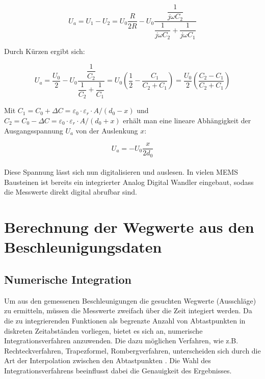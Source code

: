 \documentclass[12pt,a4paper,twoside,BCOR=12.5mm]{scrartcl}
\begin{document}
\begin{equation}
U_a = U_1 - U_2 = U_0 \frac{R}{2 R} - U_0 \dfrac{\dfrac{1}{j \omega C_2} } { \dfrac{1} {j \omega C_2} + \dfrac{1}{j \omega C_1} }
\end{equation}

Durch Kürzen ergibt sich:

\begin{equation}
U_a = \frac{U_0}{2} - U_0 \dfrac{\dfrac{1}{C_2}}{\dfrac{1}{C_2} + \dfrac{1}{C_1}} = U_0 \left( \frac{1}{2} - \frac{C_1}{C_2 + C_1} \right) = \frac{U_0}{2} \left( \frac{C_2 - C_1}{C_2 + C_1} \right)
\end{equation}

Mit $C_1 = C_0 + \Delta C = \varepsilon _0 \cdot \varepsilon _r \cdot A / (d_0 - x )$ und $C_2 = C_0 - \Delta C = \varepsilon _0 \cdot \varepsilon _r \cdot A / (d_0 + x )$ erhält man eine lineare Abhängigkeit der Ausgangsspannung $U_a$ von der Auslenkung  $x$:

\begin{equation}
U_a = - U_0 \frac{x}{2 d_0}
\end{equation}\\


Diese Spannung lässt sich nun digitalisieren und auslesen. In vielen MEMS Bausteinen ist bereits ein integrierter Analog Digital Wandler eingebaut, sodass die Messwerte direkt digital abrufbar sind. 

\newpage
\clearpage

\section{Berechnung der Wegwerte aus den Beschleunigungsdaten}

\subsection{Numerische Integration}  \label{integratechapter}
Um aus den gemessenen Beschleunigungen die gesuchten Wegwerte (Ausschläge) zu ermitteln, müssen die Messwerte zweifach über die Zeit integiert werden. Da die zu integrierenden Funktionen als begrenzte Anzahl von Abtastpunkten in diskreten Zeitabständen vorliegen, bietet es sich an, numerische Integrationsverfahren anzuwenden. Die dazu möglichen Verfahren, wie z.B. Rechteckverfahren, Trapezformel, Rombergverfahren, unterscheiden sich durch die Art der Interpolation zwischen den Abtastpunkten \citep[S. 760ff]{Bronstein:1995fk}. Die Wahl des Integrationsverfahrens beeinflusst dabei die Genauigkeit des Ergebnisses.
\end{document}
